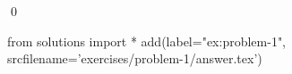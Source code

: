 
    \begin{ex}
  \label{ex:problem-1}
  
  \qed
\end{ex}
\begin{python0}
from solutions import *
add(label="ex:problem-1",
    srcfilename='exercises/problem-1/answer.tex') 
\end{python0}                              
